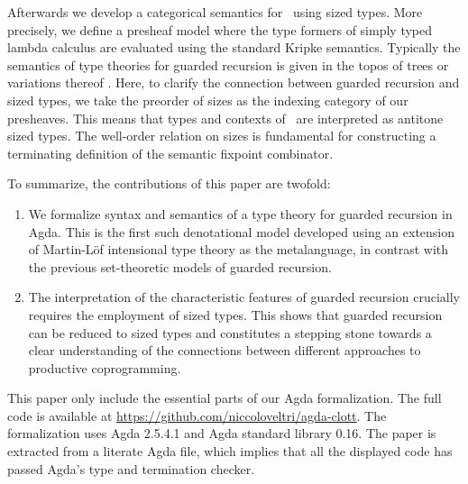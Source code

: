 Afterwards we develop a categorical semantics
for \GTT\ using sized types. More precisely, we define a presheaf
model where the type formers of simply typed lambda calculus are
evaluated using the standard Kripke semantics. Typically the semantics
of type theories for guarded recursion is given in the topos of
trees or variations thereof \cite{BMSS-synthetic,MannaaM18,Mogelberg14}.
Here, to clarify the connection between guarded recursion and
sized types, we take the preorder of sizes as the indexing
category of our presheaves. This means that types and contexts of \GTT\ are
interpreted as antitone sized types. 
The well-order relation on sizes is fundamental for constructing a
terminating definition of the semantic fixpoint combinator. 



To summarize, the contributions of this paper are twofold:
\begin{enumerate}
  \item We formalize syntax and semantics of a type theory for
    guarded recursion in Agda. This is the first such denotational model developed using an extension of Martin-L\"of intensional
    type theory as the metalanguage, in contrast with the previous
    set-theoretic models of guarded recursion.
\item The interpretation of the characteristic features of guarded
  recursion crucially requires the employment of sized types. This shows that
  guarded recursion can be reduced to sized types and
  constitutes a stepping stone towards a clear understanding of  the connections
  between different approaches to productive coprogramming.
\end{enumerate}

This paper only include the essential parts of our Agda
formalization. The full code is available at
\url{https://github.com/niccoloveltri/agda-clott}. The formalization
uses Agda 2.5.4.1 and Agda standard library 0.16. The paper is
extracted from a literate Agda file, which implies that all the
displayed code has passed Agda's type and termination checker.

